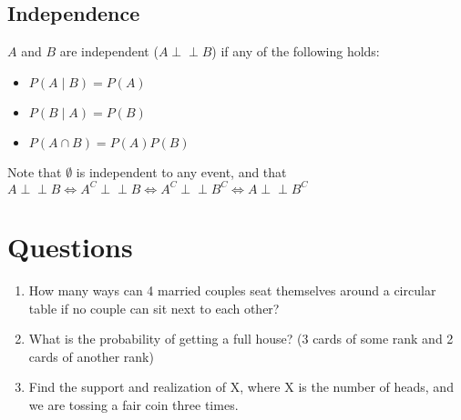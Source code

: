 \documentclass[12pt]{article}
\let\oldperp\perp
\renewcommand{\perp}[0]{\oldperp\!\!\!\oldperp}
\begin{document}
\subsection{Independence}

$A$ and $B$ are independent ($A \perp B$) if any of the following holds:

\begin{itemize}
	\item $P(A \mid B) = P(A)$ 
	\item $P(B \mid A) = P(B)$
	\item $P(A \cap B) = P(A)P(B)$
\end{itemize}

Note that $\emptyset$ is independent to any event, and that \\
$A \perp B \Leftrightarrow A^C \perp B \Leftrightarrow A^C \perp B^C \Leftrightarrow A \perp B^C$

\newpage
\section{Questions}
\begin{enumerate}
	\item How many ways can 4 married couples seat themselves around a circular table if no couple can sit next to each other?
	\item What is the probability of getting a full house? (3 cards of some rank and 2 cards of another rank)
	\item Find the support and realization of X, where X is the number of heads, and we are tossing a fair coin three times.
\end{enumerate}

\newpage 
\end{document}
